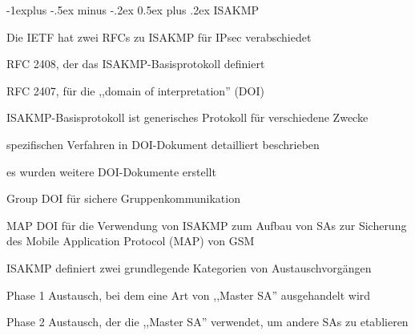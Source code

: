 \documentclass[a4paper]{article}
\makeatletter
\renewcommand{\subsection}{\@startsection{subsection}{2}{0mm}%
 {-1explus -.5ex minus -.2ex}%
 {0.5ex plus .2ex}%
 {\normalfont\normalsize\bfseries}}
\makeatother
\begin{document}
\begin{multicols}{3}
      \subsection{ISAKMP}
      \begin{itemize*}
            \item Die IETF hat zwei RFCs zu ISAKMP für IPsec verabschiedet
            \begin{itemize*}
                  \item RFC 2408, der das ISAKMP-Basisprotokoll definiert
                  \item RFC 2407, für die ,,domain of interpretation'' (DOI)
            \end{itemize*}
            \item ISAKMP-Basisprotokoll ist generisches Protokoll für verschiedene Zwecke
            \begin{itemize*}
                  \item spezifischen Verfahren in DOI-Dokument detailliert beschrieben
                  \item es wurden weitere DOI-Dokumente erstellt
                  \item Group DOI für sichere Gruppenkommunikation
                  \item MAP DOI für die Verwendung von ISAKMP zum Aufbau von SAs zur Sicherung des Mobile Application Protocol (MAP) von GSM
            \end{itemize*}
            \item ISAKMP definiert zwei grundlegende Kategorien von Austauschvorgängen
            \begin{itemize*}
                  \item Phase 1 Austausch, bei dem eine Art von ,,Master SA'' ausgehandelt wird
                  \item Phase 2 Austausch, der die ,,Master SA'' verwendet, um andere SAs zu etablieren
            \end{itemize*}
      \end{itemize*}


\end{multicols}
\end{document}
